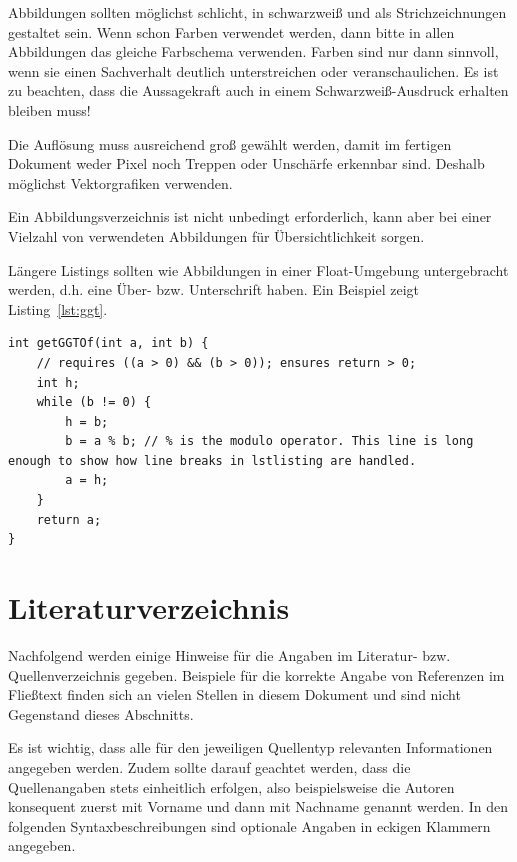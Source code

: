 \documentclass[
    fontsize=12pt,
    headings=small,
    parskip=half,           %
    bibliography=totoc,
    numbers=noenddot,       %
    open=any,               %
    ]{scrreprt}
\begin{document}
Abbildungen sollten möglichst schlicht, in schwarzweiß und als Strichzeichnungen gestaltet sein. Wenn schon Farben verwendet werden, dann bitte in allen Abbildungen das gleiche Farbschema verwenden. Farben sind nur dann sinnvoll, wenn sie einen Sachverhalt deutlich unterstreichen oder veranschaulichen. Es ist zu beachten, dass die Aussagekraft auch in einem Schwarzweiß-Ausdruck erhalten bleiben muss!

Die Auflösung muss ausreichend groß gewählt werden, damit im fertigen Dokument weder Pixel noch Treppen oder Unschärfe erkennbar sind. Deshalb möglichst Vektorgrafiken verwenden.

Ein Abbildungsverzeichnis ist nicht unbedingt erforderlich, kann aber bei einer Vielzahl von verwendeten Abbildungen für Übersichtlichkeit sorgen.

Längere Listings sollten wie Abbildungen in einer Float-Umgebung untergebracht werden, d.h. eine Über- bzw. Unterschrift haben. Ein Beispiel zeigt Listing~\ref{lst:ggt}.

\begin{lstlisting}[float,caption={Berechnung des größten gemeinsamen Teilers zweier ganzer Zahlen a und b},label={lst:ggt}]
int getGGTOf(int a, int b) {
    // requires ((a > 0) && (b > 0)); ensures return > 0;
    int h;
    while (b != 0) {
        h = b;
        b = a % b; // % is the modulo operator. This line is long enough to show how line breaks in lstlisting are handled.
        a = h;
    }
    return a;
}
\end{lstlisting}

\section{Literaturverzeichnis}

Nachfolgend werden einige Hinweise für die Angaben im Literatur- bzw. Quellenverzeichnis gegeben. Beispiele für die korrekte Angabe von Referenzen im Fließtext finden sich an vielen Stellen in diesem Dokument und sind nicht Gegenstand dieses Abschnitts.

Es ist wichtig, dass alle für den jeweiligen Quellentyp relevanten Informationen angegeben werden. Zudem sollte darauf geachtet werden, dass die Quellenangaben stets einheitlich erfolgen, also beispielsweise die Autoren konsequent zuerst mit Vorname und dann mit Nachname genannt werden. In den folgenden Syntaxbeschreibungen sind optionale Angaben in eckigen Klammern angegeben. 
\end{document}
